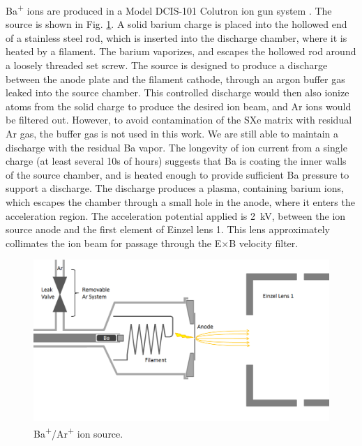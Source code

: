 Ba\textsuperscript{+} ions are produced in a Model DCIS-101 Colutron ion gun system \cite{Colutron}.  The source is shown in Fig. \ref{fig:ionsource}.  A solid barium charge is placed into the hollowed end of a stainless steel rod, which is inserted into the discharge chamber, where it is heated by a filament.  The barium vaporizes, and escapes the hollowed rod around a loosely threaded set screw.  The source is designed to produce a discharge between the anode plate and the filament cathode, through an argon buffer gas leaked into the source chamber.  This controlled discharge would then also ionize atoms from the solid charge to produce the desired ion beam, and Ar ions would be filtered out.  However, to avoid contamination of the SXe matrix with residual Ar gas, the buffer gas is not used in this work.  We are still able to maintain a discharge with the residual Ba vapor.  The longevity of ion current from a single charge (at least several 10s of hours) suggests that Ba is coating the inner walls of the source chamber, and is heated enough to provide sufficient Ba pressure to support a discharge.  The discharge produces a plasma, containing barium ions, which escapes the chamber through a small hole in the anode, where it enters the acceleration region.  The acceleration potential applied is 2~kV, between the ion source anode and the first element of Einzel lens 1.  This lens approximately collimates the ion beam for passage through the E$\times$B velocity filter.


\begin{figure} %
        \centering
                \includegraphics[width=.95\textwidth]{figures/ionSource.png}
                \caption{Ba\textsuperscript{+}/Ar\textsuperscript{+} ion source.}
\label{fig:ionsource}
\end{figure}

